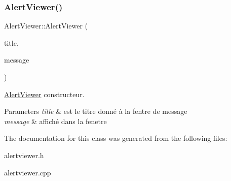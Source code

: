 \subsubsection{\texorpdfstring{Alert\+Viewer()}{AlertViewer()}}
{\footnotesize\ttfamily Alert\+Viewer\+::\+Alert\+Viewer (\begin{DoxyParamCaption}\item[{const Q\+String \&}]{title,  }\item[{const Q\+String \&}]{message }\end{DoxyParamCaption})}



\hyperlink{classAlertViewer}{Alert\+Viewer} constructeur. 


\begin{DoxyParams}{Parameters}
{\em title} & est le titre donné à la fentre de message \\
\hline
{\em message} & affiché dans la fenetre \\
\hline
\end{DoxyParams}


The documentation for this class was generated from the following files\+:\begin{DoxyCompactItemize}
\item 
alertviewer.\+h\item 
alertviewer.\+cpp\end{DoxyCompactItemize}
